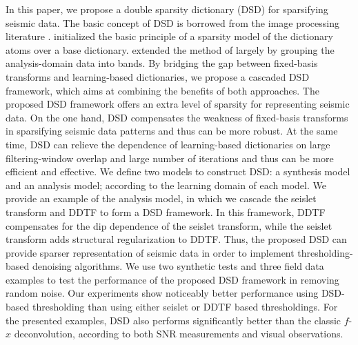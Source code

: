 In this paper, we propose a double sparsity dictionary (DSD) for sparsifying seismic data. The basic concept of DSD is borrowed from the image processing literature \cite[]{ron2010,ophir2011}. \cite{ron2010} initialized the basic principle of a sparsity model of the dictionary atoms over a base dictionary. \cite{ophir2011} extended the method of \cite{ron2010} largely by grouping the analysis-domain data into bands. By bridging the gap between fixed-basis transforms and learning-based dictionaries, we propose a cascaded DSD framework, which aims at combining the benefits of both approaches. The proposed DSD framework offers an extra level of sparsity for representing seismic data. On the one hand, DSD compensates the weakness of fixed-basis transforms in sparsifying seismic data patterns and thus can be more robust. At the same time, DSD can relieve the dependence of learning-based dictionaries on large filtering-window overlap and large number of iterations and thus can be more efficient and effective. We define two models to construct DSD: a synthesis model and an analysis model; according to the learning domain of each model. %
We provide an example of the analysis model, in which we cascade the seislet transform and DDTF to form a DSD framework. In this framework, DDTF  compensates for the dip dependence of the seislet transform, while the seislet transform adds structural regularization to DDTF. Thus, the proposed DSD can provide sparser representation of seismic data in order to implement thresholding-based denoising algorithms. We use two synthetic tests and three field data examples to test the performance of the proposed DSD framework in removing random noise. Our experiments show noticeably better performance using DSD-based thresholding than using either seislet or DDTF based thresholdings. For the presented examples, DSD also performs significantly better than the classic $f$-$x$ deconvolution, according to both SNR measurements and visual observations.



